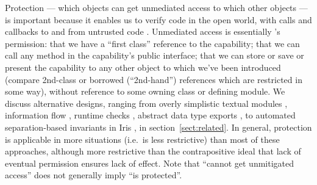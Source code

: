 {{%
Protection --- which objects can get unmediated access
to which other objects ---  is important because it enables
us to verify code in the open world, %
with
calls
and callbacks to and
from untrusted code \cite{praiseYou}.   Unmediated access is
essentially \citet{MillerPhD}'s permission: that we have a ``first
class'' reference to the capability; that we can call any 
method in the capability's public interface; that we can
store or save or present the capability to any other
object to which we've been introduced
(compare
2nd-class \cite{rompf-second-class-oopsla2016,rompf-dont-pop-second-class-ecoop2022}
or borrowed (``2nd-hand'') references
\cite{boyland-promises-icse1998,boyland-aliasburying-spe2001}
which are restricted in some way),
without reference to some owning class or defining module.
We discuss alternative designs,
ranging from overly simplistic textual modules \cite{OOPSLA22},
information flow \cite{ddd}, runtime
checks \cite{secure-io-fstar-popl2024},
abstract data type exports \cite{vmsl-pldi2023},
to automated separation-based invariants in
Iris \cite{iris-wasm-pldi2023,cerise-jacm2024},
in section~\ref{sect:related}.
In general, protection is applicable in more situations (i.e.\ is less
restrictive) than most of these approaches,
although more restrictive than
the contrapositive ideal that lack of eventual permission ensures
lack of effect. Note that ``cannot get unmitigated access'' does not generally imply ``is
protected''. 




}}
